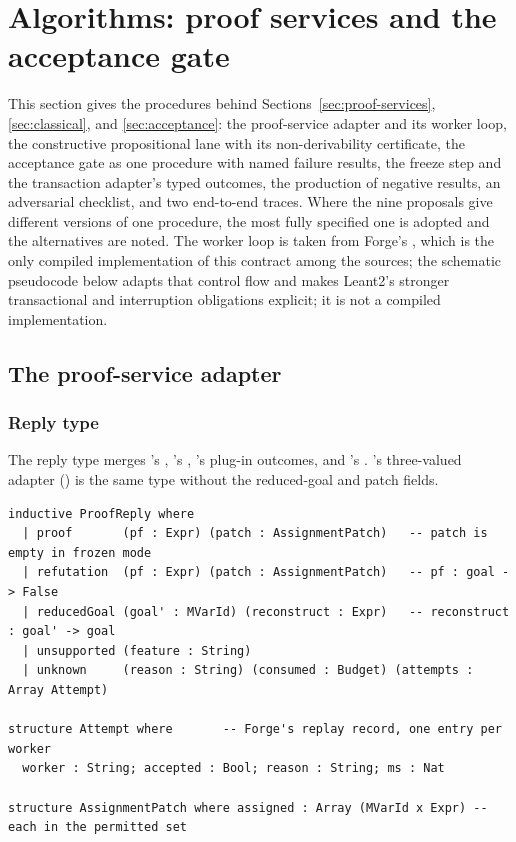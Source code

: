 \section{Algorithms: proof services and the acceptance gate}\label{alg:acceptance}

This section gives the procedures behind Sections~\ref{sec:proof-services}, \ref{sec:classical}, and \ref{sec:acceptance}: the proof-service adapter and its worker loop, the constructive propositional lane with its non-derivability certificate, the acceptance gate as one procedure with named failure results, the freeze step and the transaction adapter's typed outcomes, the production of negative results, an adversarial checklist, and two end-to-end traces. Where the nine proposals give different versions of one procedure, the most fully specified one is adopted and the alternatives are noted. The worker loop is taken from Forge's  \cite{forge}, which is the only compiled implementation of this contract among the sources; the schematic pseudocode below adapts that control flow and makes Leant2's stronger transactional and interruption obligations explicit; it is not a compiled implementation.

\subsection{The proof-service adapter}\label{alg:proof-adapter}

\subsubsection{Reply type}

The reply type merges 's , 's , 's plug-in outcomes, and 's . 's three-valued adapter () is the same type without the reduced-goal and patch fields.
\begin{lstlisting}
inductive ProofReply where
  | proof       (pf : Expr) (patch : AssignmentPatch)   -- patch is empty in frozen mode
  | refutation  (pf : Expr) (patch : AssignmentPatch)   -- pf : goal -> False
  | reducedGoal (goal' : MVarId) (reconstruct : Expr)   -- reconstruct : goal' -> goal
  | unsupported (feature : String)
  | unknown     (reason : String) (consumed : Budget) (attempts : Array Attempt)

structure Attempt where       -- Forge's replay record, one entry per worker
  worker : String; accepted : Bool; reason : String; ms : Nat

structure AssignmentPatch where assigned : Array (MVarId x Expr) -- each in the permitted set
\end{lstlisting}

